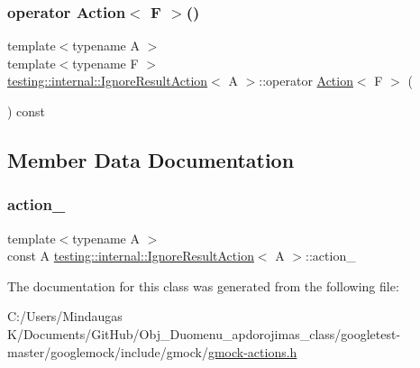 \mbox{\label{classtesting_1_1internal_1_1_ignore_result_action_affb8b7439604c860e1416f45339c6e37}} 
\subsubsection{\texorpdfstring{operator Action$<$ F $>$()}{operator Action< F >()}\hspace{0.1cm}{\footnotesize\ttfamily [3/3]}}
{\footnotesize\ttfamily template$<$typename A $>$ \\
template$<$typename F $>$ \\
\mbox{\hyperlink{classtesting_1_1internal_1_1_ignore_result_action}{testing\+::internal\+::\+Ignore\+Result\+Action}}$<$ A $>$\+::operator \mbox{\hyperlink{classtesting_1_1_action}{Action}}$<$ F $>$ (\begin{DoxyParamCaption}{ }\end{DoxyParamCaption}) const\hspace{0.3cm}{\ttfamily [inline]}}



\subsection{Member Data Documentation}
\mbox{\label{classtesting_1_1internal_1_1_ignore_result_action_a3a1ad6d29d904acb4ca41eeee45de4a0}} 
\subsubsection{\texorpdfstring{action\_}{action\_}}
{\footnotesize\ttfamily template$<$typename A $>$ \\
const A \mbox{\hyperlink{classtesting_1_1internal_1_1_ignore_result_action}{testing\+::internal\+::\+Ignore\+Result\+Action}}$<$ A $>$\+::action\+\_\+\hspace{0.3cm}{\ttfamily [private]}}



The documentation for this class was generated from the following file\+:\begin{DoxyCompactItemize}
\item 
C\+:/\+Users/\+Mindaugas K/\+Documents/\+Git\+Hub/\+Obj\+\_\+\+Duomenu\+\_\+apdorojimas\+\_\+class/googletest-\/master/googlemock/include/gmock/\mbox{\hyperlink{googletest-master_2googlemock_2include_2gmock_2gmock-actions_8h}{gmock-\/actions.\+h}}\end{DoxyCompactItemize}
